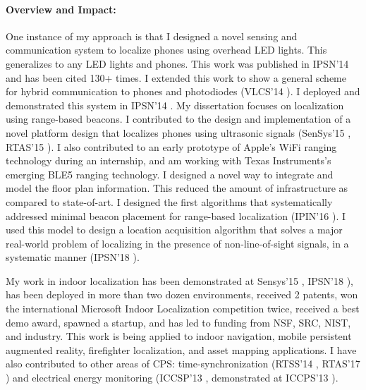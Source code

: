 \documentclass[10pt]{article}
\begin{document}
\paragraph{Overview and Impact:}
One instance of my approach is that I designed a novel sensing and communication system to localize phones using overhead LED lights. This generalizes to any LED lights and phones. This work was published in IPSN'14\cite{rajagopal2014visual} and has been
cited 130+ times. I extended this work to show a general scheme for hybrid communication to phones and photodiodes (VLCS'14 \cite{rajagopal2014hybrid}). I deployed and demonstrated this system in IPSN'14 \cite{rajagopal2014demonstration}. My dissertation focuses on localization using range-based beacons. I contributed to the design and implementation of a novel platform design that localizes phones using ultrasonic signals (SenSys'15 \cite{lazik2015alps},
RTAS'15 \cite{rtas-alps-platform}). I also contributed to an early prototype of Apple's WiFi ranging technology during an internship, and am working with Texas Instruments's emerging BLE5 ranging technology. %
I designed a novel way to integrate and model the floor plan information. This reduced the amount of infrastructure as compared to state-of-art. I designed the first algorithms that systematically addressed minimal beacon placement for range-based localization (IPIN'16 \cite{rajagopal2016beacon}). I used this model to design a location acquisition algorithm that solves a major real-world problem of localizing in the presence of non-line-of-sight signals, in a systematic manner (IPSN'18 \cite{rajagopal2018enhancing}). 

My work in indoor localization has been demonstrated at
Sensys'15 \cite{lazik2015alpsdemo}, IPSN'18 \cite{rajagopal2018welcome}), has been deployed in more than two dozen environments, received 2 patents, won the international
Microsoft Indoor Localization competition twice, received a best demo
award, spawned a startup, and has led to funding from NSF, SRC, NIST, and
industry. This work is being applied to indoor navigation, mobile
persistent augmented reality, firefighter localization, and asset
mapping applications.  I have also contributed to other areas of CPS:
time-synchronization (RTSS'14 \cite{buevich2013hardware}, RTAS'17 \cite{dongare2017pulsar}) and electrical energy
monitoring (ICCSP'13 \cite{rajagopal2013magnetic}, demonstrated at ICCPS'13 \cite{rajagopal2013demo}).


\end{document}
